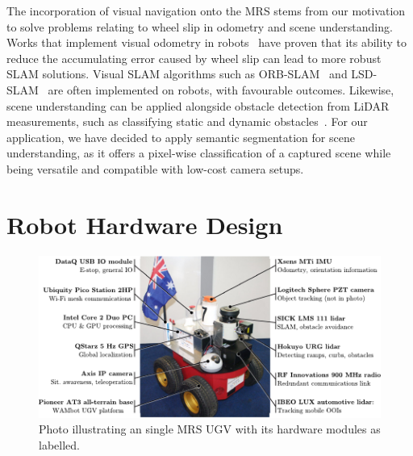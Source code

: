 The incorporation of visual navigation onto the MRS stems from our motivation to solve problems relating to wheel slip in odometry and scene understanding. Works that implement visual odometry in robots~\cite{kunii_mobile_2017, sun_sequentially_2017, kim_effective_2016} have proven that its ability to reduce the accumulating error caused by wheel slip can lead to more robust SLAM solutions. Visual SLAM algorithms such as ORB-SLAM~\cite{mur-artal_orb-slam2:_2017} and LSD-SLAM~\cite{engel_lsd-slam:_2014} are often implemented on robots, with favourable outcomes. Likewise, scene understanding can be applied alongside obstacle detection from LiDAR measurements, such as classifying static and dynamic obstacles~\cite{zhou_dynamic_2018}. For our application, we have decided to apply semantic segmentation for scene understanding, as it offers a pixel-wise classification of a captured scene while being versatile and compatible with low-cost camera setups.

\section{Robot Hardware Design}
\begin{figure}[H]
	\centering
	\includegraphics[width=\linewidth]{fig1}
	\caption[MRS UGV with hardware modules]{Photo illustrating an single MRS UGV with its hardware modules as labelled.}
	\label{fig:4:design}
\end{figure} 


